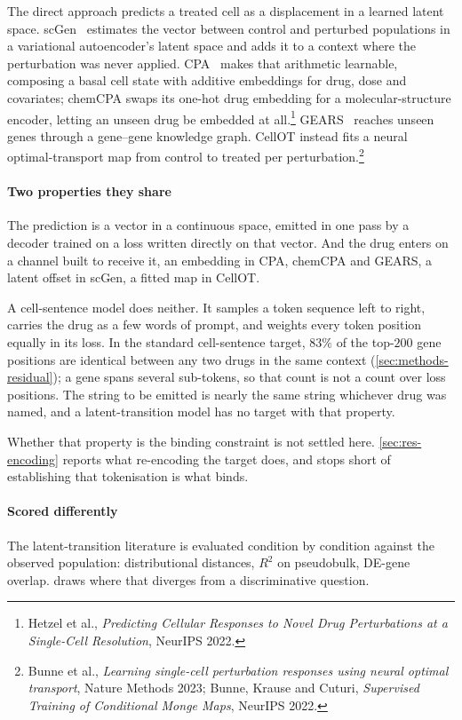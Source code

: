 \noindent
The direct approach predicts a treated cell as a displacement in a learned
latent space. scGen~\cite{scgen} estimates the vector between control and
perturbed populations in a variational autoencoder's latent space and adds it to
a context where the perturbation was never applied. CPA~\cite{cpa} makes that
arithmetic learnable, composing a basal cell state with additive embeddings for
drug, dose and covariates; chemCPA swaps its one-hot drug embedding for a
molecular-structure encoder, letting an unseen drug be embedded at
all.\footnote{Hetzel et al., \emph{Predicting Cellular Responses to Novel Drug
Perturbations at a Single-Cell Resolution}, NeurIPS 2022.} GEARS~\cite{gears}
reaches unseen genes through a gene--gene knowledge graph. CellOT instead fits a
neural optimal-transport map from control to treated per perturbation.\footnote{
Bunne et al., \emph{Learning single-cell perturbation responses using neural
optimal transport}, Nature Methods 2023; Bunne, Krause and Cuturi,
\emph{Supervised Training of Conditional Monge Maps}, NeurIPS 2022.}

\paragraph{Two properties they share} The prediction is a vector in a continuous
space, emitted in one pass by a decoder trained on a loss written directly on
that vector. And the drug enters on a channel built to receive it, an embedding
in CPA, chemCPA and GEARS, a latent offset in scGen, a fitted map in CellOT.

A cell-sentence model does neither. It samples a token sequence left to right,
carries the drug as a few words of prompt, and weights every token position
equally in its loss. In the standard cell-sentence target, $83\%$ of the
top-$200$ gene positions are identical between any two drugs in the same context
(\cref{sec:methods-residual}); a gene spans several sub-tokens, so that count is
not a count over loss positions. The string to be emitted is nearly the same string
whichever drug was named, and a latent-transition model has no target with that
property.

Whether that property is the binding constraint is not settled here.
\cref{sec:res-encoding} reports what re-encoding the target does, and stops
short of establishing that tokenisation is what binds.

\paragraph{Scored differently} The latent-transition literature is evaluated
condition by condition against the observed population: distributional distances,
$R^2$ on pseudobulk, DE-gene overlap.  draws where that
diverges from a discriminative question.

